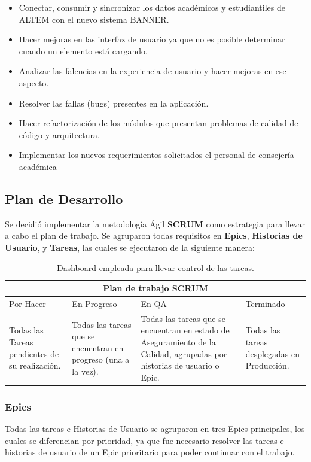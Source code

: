 \begin{itemize}
    \item Conectar, consumir y sincronizar los datos académicos y estudiantiles de ALTEM con el nuevo sistema BANNER.
    \item Hacer mejoras en las interfaz de usuario ya que no es posible determinar cuando un elemento está cargando.
    \item Analizar las falencias en la experiencia de usuario y hacer mejoras en ese aspecto.
    \item Resolver las fallas (bugs) presentes en la aplicación.
    \item Hacer refactorización de los módulos que presentan problemas de calidad de código y arquitectura.
    \item Implementar los nuevos requerimientos solicitados el personal de consejería académica
\end{itemize}

\subsection{Plan de Desarrollo}
Se decidió implementar la metodología Ágil \textbf{SCRUM} como estrategia para llevar a cabo el plan de trabajo.
Se agruparon todas requisitos en \textbf{Epics}, \textbf{Historias de Usuario}, y \textbf{Tareas}, las cuales se ejecutaron de la siguiente manera:

\begin{table}[H]
    \centering
    \begin{tabular}{ |p{3cm}|p{3cm}|p{3cm}|p{3cm}|  }
     \hline
     \multicolumn{4}{|c|}{Plan de trabajo SCRUM} \\
     \hline
     Por Hacer & En Progreso & En QA & Terminado\\
     \hline
     Todas las Tareas pendientes de su realización. & Todas las tareas que se encuentran en progreso (una a la vez). & Todas las tareas que se encuentran en estado de Aseguramiento de la Calidad, agrupadas por historias de usuario o Epic. & Todas las tareas desplegadas en Producción. \\
     \hline
    \end{tabular}
    \label{Plan de trabajo SCRUM}
    \caption{Dashboard empleada para llevar control de las tareas.}
\end{table}

\subsubsection{Epics}
Todas las tareas e Historias de Usuario se agruparon en tres Epics principales, los cuales se diferencian por prioridad, ya que fue necesario resolver las tareas e historias de usuario de un Epic prioritario para poder continuar con el trabajo.

